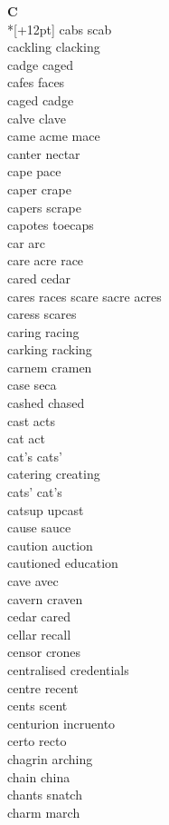 \vspace{14pt}
\noindent\textbf{\Large C}\\*[+12pt]
cabs scab\\
cackling clacking\\
cadge caged\\
cafes faces\\
caged cadge\\
calve clave\\
came acme mace\\
canter nectar\\
cape pace\\
caper crape\\
capers scrape\\
capotes toecaps\\
car arc\\
care acre race\\
cared cedar\\
cares races scare sacre acres\\
caress scares\\
caring racing\\
carking racking\\
carnem cramen\\
case seca\\
cashed chased\\
cast acts\\
cat act\\
cat's cats'\\
catering creating\\
cats' cat's\\
catsup upcast\\
cause sauce\\
caution auction\\
cautioned education\\
cave avec\\
cavern craven\\
cedar cared\\
cellar recall\\
censor crones\\
centralised credentials\\
centre recent\\
cents scent\\
centurion incruento\\
certo recto\\
chagrin arching\\
chain china\\
chants snatch\\
charm march\\

